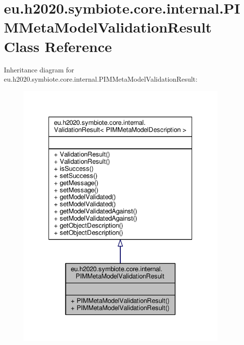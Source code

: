 \hypertarget{classeu_1_1h2020_1_1symbiote_1_1core_1_1internal_1_1PIMMetaModelValidationResult}{}\section{eu.\+h2020.\+symbiote.\+core.\+internal.\+P\+I\+M\+Meta\+Model\+Validation\+Result Class Reference}
\label{classeu_1_1h2020_1_1symbiote_1_1core_1_1internal_1_1PIMMetaModelValidationResult}


Inheritance diagram for eu.\+h2020.\+symbiote.\+core.\+internal.\+P\+I\+M\+Meta\+Model\+Validation\+Result\+:
\nopagebreak
\begin{figure}[H]
\begin{center}
\leavevmode
\includegraphics[width=300pt]{classeu_1_1h2020_1_1symbiote_1_1core_1_1internal_1_1PIMMetaModelValidationResult__inherit__graph}
\end{center}
\end{figure}


